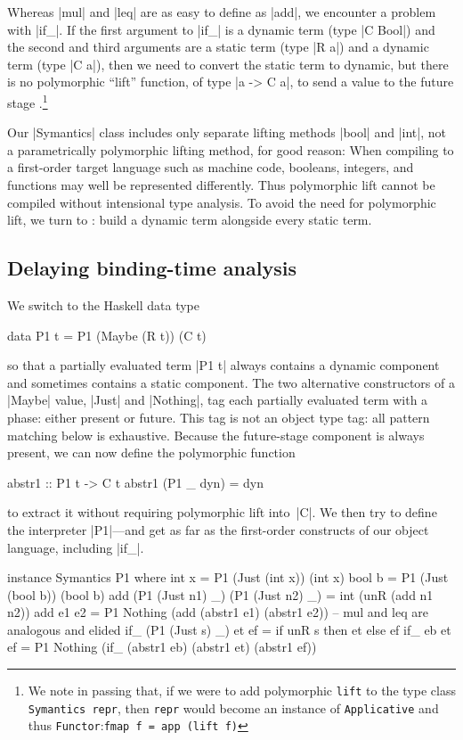 \documentclass[preprint]{sigplanconf}
\begin{document}
Whereas |mul| and |leq| are as easy to define as |add|, we encounter
a problem with |if_|.  If the first argument to |if_| is a dynamic term
(type |C Bool|) and the second and third arguments are a static term
(type |R a|) and a dynamic term (type |C a|), then we need to convert
the static term to dynamic, but there is no polymorphic ``lift''
function, of type |a -> C a|, to send a value to the future stage
\citep{xi-guarded,WalidPOPL03}.\footnote{We note in passing that, if we
were to add polymorphic \texttt{lift} to the type class
\texttt{Symantics repr}, then \texttt{repr} would become an instance of
\texttt{Applicative} and thus \texttt{Functor}:\quad\texttt{fmap
f = app (lift f)}}

Our |Symantics| class includes only separate lifting methods |bool| and
|int|, not a parametrically polymorphic lifting method, for good reason:
When compiling to a first-order target language such as machine code,
booleans, integers, and functions may well be represented differently.
Thus polymorphic lift cannot be compiled without intensional type
analysis.  To avoid the need for polymorphic lift, we turn to
\citet[see also \citealp{sumii-hybrid}]{asai-binding-time}:
build a dynamic term
alongside every static term.

\subsection{Delaying binding-time analysis}
\label{S:PE-problem}

We switch to the Haskell data type
\begin{code}
data P1 t = P1 (Maybe (R t)) (C t)
\end{code}
so that a partially evaluated term |P1 t| always contains a dynamic
component and sometimes contains a static component.  The two
alternative constructors of a |Maybe| value, |Just| and |Nothing|,
tag each partially evaluated term with a phase: either present or
future.  This tag is not an object type tag: all pattern matching below
is exhaustive.  Because the future-stage component is always present, we
can now define the polymorphic function
\begin{code}
abstr1 :: P1 t -> C t
abstr1 (P1 _ dyn) = dyn
\end{code}
to extract it without requiring polymorphic lift into~|C|.  We then try
to define the interpreter |P1|---and get as far as the first-order
constructs of our object language, including |if_|.
\begin{code}
instance Symantics P1 where
  int  x = P1 (Just (int x)) (int x)
  bool b = P1 (Just (bool b)) (bool b)
  add (P1 (Just n1) _) (P1 (Just n2) _)
    = int (unR (add n1 n2))
  add e1 e2 = P1 Nothing
    (add (abstr1 e1) (abstr1 e2))
  -- mul and leq are analogous and elided
  if_ (P1 (Just s) _) et ef
    = if unR s then et else ef
  if_ eb et ef = P1 Nothing
    (if_ (abstr1 eb) (abstr1 et) (abstr1 ef))
\end{code}
\end{document}

